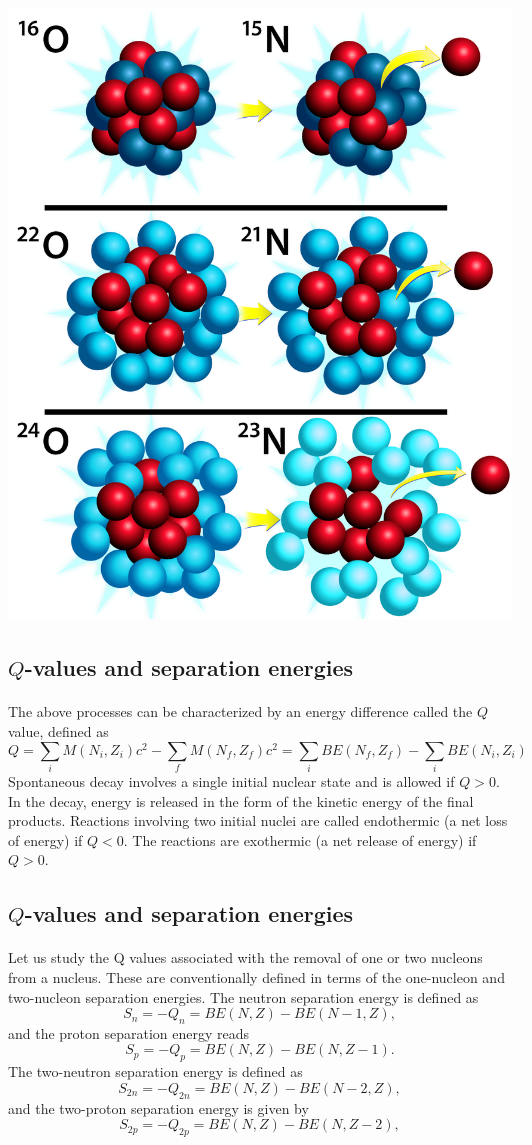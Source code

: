 \documentclass[%
twoside,                 %
final,                   %
10pt]{article}
\begin{document}
\centerline{\includegraphics[width=0.6\linewidth]{figslides/oxygens.jpg}}




\subsection*{$Q$-values and separation energies}

\paragraph{}
The above processes can be characterized by an energy difference called the $Q$ value, defined as
\[
Q=\sum_i M(N_i, Z_i)c^2-\sum_f M(N_f, Z_f)c^2=\sum_i BE(N_f, Z_f)-\sum_i BE(N_i, Z_i)
\]
Spontaneous decay involves a single initial nuclear state and is allowed if $Q > 0$. In the decay, energy is released in the form of the kinetic energy of the final products. Reactions involving two initial nuclei are called endothermic (a net loss of energy) if $Q < 0$. The reactions are exothermic (a net release of energy) if $Q > 0$.




\subsection*{$Q$-values and separation energies}

\paragraph{}
Let us study the Q values associated with the removal of one or two nucleons from
a nucleus. These are conventionally defined in terms of the one-nucleon and two-nucleon
separation energies. The neutron separation energy is defined as 
\[
S_n= -Q_n= BE(N,Z)-BE(N-1,Z),
\]
and the proton separation energy reads
\[
S_p= -Q_p= BE(N,Z)-BE(N,Z-1).
\]
The two-neutron separation energy is defined as
\[
S_{2n}= -Q_{2n}= BE(N,Z)-BE(N-2,Z),
\]
and  the two-proton separation energy is given by
\[
S_{2p}= -Q_{2p}= BE(N,Z)-BE(N,Z-2),
\]
\end{document}
